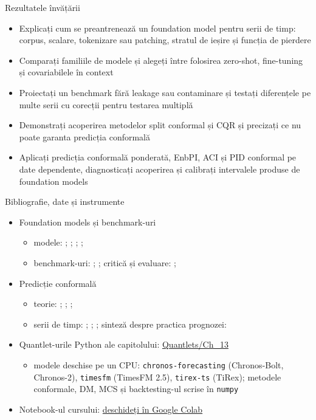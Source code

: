 \begin{frame}{Rezultatele învățării}
\itemsize{\small}
\begin{itemize}
    \item Explicați cum se preantrenează un foundation model pentru serii de timp: corpus, scalare, tokenizare sau patching, stratul de ieșire și funcția de pierdere
    \item Comparați familiile de modele și alegeți între folosirea zero-shot, fine-tuning și covariabilele în context
    \item Proiectați un benchmark fără leakage sau contaminare și testați diferențele pe multe serii cu corecții pentru testarea multiplă
    \item Demonstrați acoperirea metodelor split conformal și CQR și precizați ce nu poate garanta predicția conformală
    \item Aplicați predicția conformală ponderată, EnbPI, ACI și PID conformal pe date dependente, diagnosticați acoperirea și calibrați intervalele produse de foundation models
\end{itemize}
\end{frame}

\begin{frame}{Bibliografie, date și instrumente}
\itemsize{\small}
\begin{itemize}
    \item Foundation models și benchmark-uri
    \begin{itemize}
        \item modele: ; ; ; ; 
        \item benchmark-uri: ; ; critică și evaluare: ; 
    \end{itemize}
    \item Predicție conformală
    \begin{itemize}
        \item teorie: ; ; ; 
        \item serii de timp: ; ; ; sinteză despre practica prognozei: 
    \end{itemize}
    \item Quantlet-urile Python ale capitolului: \href{https://github.com/danpele/Advanced-Time-Series/tree/main/Quantlets/Ch_13}{Quantlets/Ch\_13}
    \begin{itemize}
        \item modele deschise pe un CPU: \texttt{chronos-forecasting} (Chronos-Bolt, Chronos-2), \texttt{timesfm} (TimesFM 2.5), \texttt{tirex-ts} (TiRex); metodele conformale, DM, MCS și backtesting-ul scrise în \texttt{numpy}
    \end{itemize}
    \item Notebook-ul cursului: \href{\colaburl{notebooks/EN/chapter13_lecture_notebook.ipynb}}{deschideți în Google Colab}
\end{itemize}
\end{frame}

